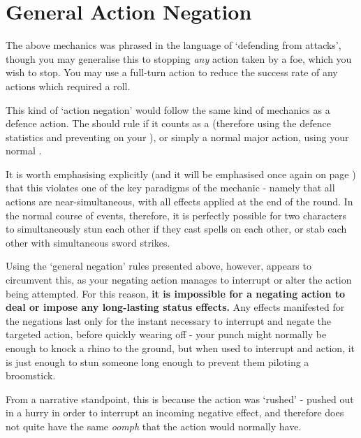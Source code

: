 \section{General Action Negation}

The above mechanics was phrased in the language of `defending from attacks', though you may generalise this to stopping {\it any} action taken by a foe, which you wish to stop. You may use a full-turn action to reduce the success rate of any actions which required a roll. 

This kind of `action negation' would follow the same kind of mechanics as a defence action. The  should rule if it counts as a  (therefore using the defence statistics and preventing  on your ), or simply a normal major action, using your normal . 

It is worth emphasising explicitly (and it will be emphasised once again on page \pageref{S:CycleLimitations}) that this violates one of the key paradigms of the  mechanic - namely that all actions are near-simultaneous, with all effects applied at the end of the round. In the normal course of events, therefore, it is perfectly possible for two characters to simultaneously stun each other if they cast spells on each other, or stab each other with simultaneous sword strikes.

Using the `general negation' rules presented above, however, appears to circumvent this, as your negating action manages to interrupt or alter the action being attempted. For this reason, {\bf it is impossible for a negating action to deal  or impose any long-lasting status effects.} Any effects manifested for the negations last only for the instant necessary to interrupt and negate the targeted action, before quickly wearing off - your punch might normally be enough to knock a rhino to the ground, but when used to interrupt and action, it is just enough to stun someone long enough to prevent them piloting a broomstick.

 From a narrative standpoint, this is because the action was `rushed' - pushed out in a hurry in order to interrupt an incoming negative effect, and therefore does not quite have the same {\it oomph} that the action would normally have. 
